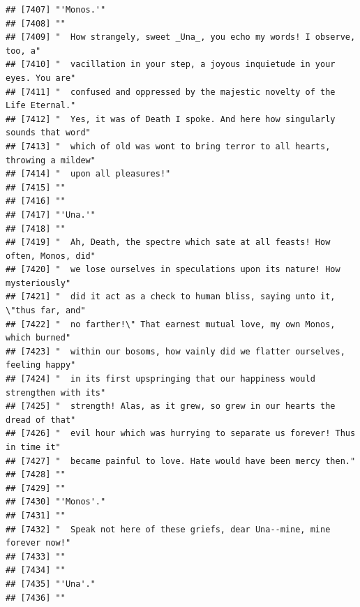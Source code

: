 \documentclass{article}\usepackage[]{graphicx}\usepackage[]{color}
\makeatletter
\newenvironment{kframe}{%
 \def\at@end@of@kframe{}%
 \ifinner\ifhmode%
  \def\at@end@of@kframe{\end{minipage}}%
  \begin{minipage}{\columnwidth}%
 \fi\fi%
 \def\FrameCommand##1{\hskip\@totalleftmargin \hskip-\fboxsep
 \colorbox{shadecolor}{##1}\hskip-\fboxsep
     \hskip-\linewidth \hskip-\@totalleftmargin \hskip\columnwidth}%
 \MakeFramed {\advance\hsize-\width
   \@totalleftmargin\z@ \linewidth\hsize
   \@setminipage}}%
 {\par\unskip\endMakeFramed%
 \at@end@of@kframe}
\newenvironment{knitrout}{}{} %
\makeatother
\begin{document}
\begin{knitrout}
\begin{kframe}
\begin{verbatim}
## [7407] "'Monos.'"                                                                    
## [7408] ""                                                                            
## [7409] "  How strangely, sweet _Una_, you echo my words! I observe, too, a"          
## [7410] "  vacillation in your step, a joyous inquietude in your eyes. You are"       
## [7411] "  confused and oppressed by the majestic novelty of the Life Eternal."       
## [7412] "  Yes, it was of Death I spoke. And here how singularly sounds that word"    
## [7413] "  which of old was wont to bring terror to all hearts, throwing a mildew"    
## [7414] "  upon all pleasures!"                                                       
## [7415] ""                                                                            
## [7416] ""                                                                            
## [7417] "'Una.'"                                                                      
## [7418] ""                                                                            
## [7419] "  Ah, Death, the spectre which sate at all feasts! How often, Monos, did"    
## [7420] "  we lose ourselves in speculations upon its nature! How mysteriously"       
## [7421] "  did it act as a check to human bliss, saying unto it, \"thus far, and"     
## [7422] "  no farther!\" That earnest mutual love, my own Monos, which burned"        
## [7423] "  within our bosoms, how vainly did we flatter ourselves, feeling happy"     
## [7424] "  in its first upspringing that our happiness would strengthen with its"     
## [7425] "  strength! Alas, as it grew, so grew in our hearts the dread of that"       
## [7426] "  evil hour which was hurrying to separate us forever! Thus in time it"      
## [7427] "  became painful to love. Hate would have been mercy then."                  
## [7428] ""                                                                            
## [7429] ""                                                                            
## [7430] "'Monos'."                                                                    
## [7431] ""                                                                            
## [7432] "  Speak not here of these griefs, dear Una--mine, mine forever now!"         
## [7433] ""                                                                            
## [7434] ""                                                                            
## [7435] "'Una'."                                                                      
## [7436] ""                                                                            

\end{verbatim}
\end{kframe}
\end{knitrout}
\end{document}
